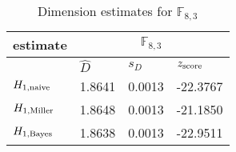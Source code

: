 \begin{table}[H] 
\begin{center}
\caption{Dimension estimates for $\mathbb{F}_{8,3}$}
\label{tab:est4s}
\begin{tabular}{|l|l|l|l|}
\hline
 estimate & \multicolumn{3}{c|}{$\mathbb{F}_{8,3}$} \\
\hline
 & $\hat{D}$ & $s_{D}$ & $z_{\mbox{\scriptsize{score}}}$ \\
\hline
$ H_{1,\mbox{\scriptsize{naive}}}  $ & 1.8641 & 0.0013 & -22.3767 \\ 
\hline 
$ H_{1,\mbox{\scriptsize{Miller}}} $ & 1.8648 & 0.0013 & -21.1850 \\ 
\hline 
$ H_{1,\mbox{\scriptsize{Bayes}}} $ & 1.8638 & 0.0013 & -22.9511 \\ 
\hline 
\end{tabular}
\end{center}
\end{table}

